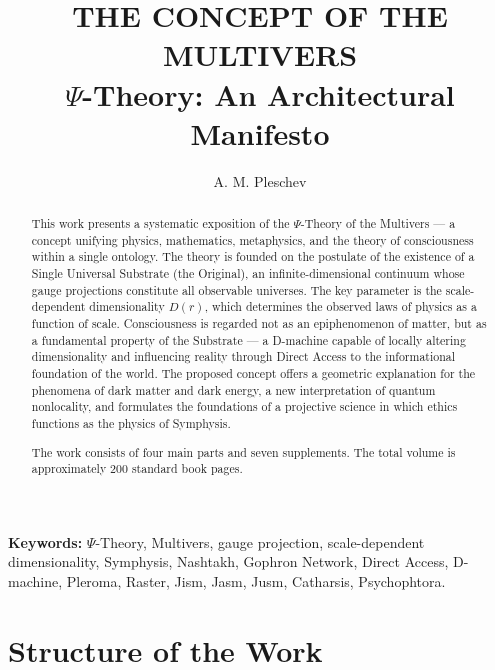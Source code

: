 \documentclass[a4paper,12pt]{article}
\begin{document}
	
	\title{\textbf{THE CONCEPT OF THE MULTIVERS}\\[0.5em]\large $\Psi$-Theory: An Architectural Manifesto}
	\author{A. M. Pleschev}
	\date{}
	\maketitle
	
	\begin{abstract}
		This work presents a systematic exposition of the $\Psi$-Theory of the Multivers — a concept unifying physics, mathematics, metaphysics, and the theory of consciousness within a single ontology. The theory is founded on the postulate of the existence of a Single Universal Substrate (the Original), an infinite-dimensional continuum whose gauge projections constitute all observable universes. The key parameter is the scale-dependent dimensionality $D(r)$, which determines the observed laws of physics as a function of scale. Consciousness is regarded not as an epiphenomenon of matter, but as a fundamental property of the Substrate — a D-machine capable of locally altering dimensionality and influencing reality through Direct Access to the informational foundation of the world. The proposed concept offers a geometric explanation for the phenomena of dark matter and dark energy, a new interpretation of quantum nonlocality, and formulates the foundations of a projective science in which ethics functions as the physics of Symphysis.
		
		The work consists of four main parts and seven supplements. The total volume is approximately 200 standard book pages.
	\end{abstract}
	
	\vspace{1cm}
	\noindent\textbf{Keywords:} $\Psi$-Theory, Multivers, gauge projection, scale-dependent dimensionality, Symphysis, Nashtakh, Gophron Network, Direct Access, D-machine, Pleroma, Raster, Jism, Jasm, Jusm, Catharsis, Psychophtora.
	
	\newpage
	
	\section*{Structure of the Work}
	
\end{document}
